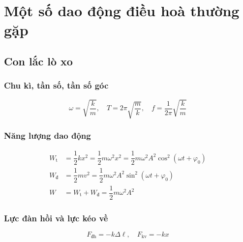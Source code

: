 \section{Một số dao động điều hoà thường gặp}
\subsection{Con lắc lò xo}
\subsubsection{Chu kì, tần số, tần số góc}
$$\omega=\sqrt{\dfrac{k}{m}},\quad T=2\pi\sqrt{\dfrac{m}{k}},\quad f=\dfrac{1}{2\pi}\sqrt{\dfrac{k}{m}}$$
\subsubsection{Năng lượng dao động}
\begin{align*}
	W_\text{t}&=\dfrac{1}{2}kx^2=\dfrac{1}{2}m\omega^2x^2=\dfrac{1}{2}m\omega^2A^2\cos^2\left(\omega t+\varphi_0\right)\\
	W_\text{đ}&=\dfrac{1}{2}mv^2=\dfrac{1}{2}m\omega^2A^2\sin^2\left(\omega t+\varphi_0\right)\\
	W&=W_\text{t}+W_\text{đ}=\dfrac{1}{2}m\omega^2A^2
\end{align*}
\subsubsection{Lực đàn hồi và lực kéo về}
$$F_\text{đh}=-k\Delta\ell,\quad F_\text{kv}=-kx$$
